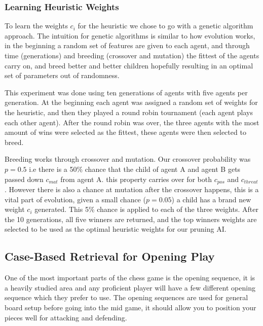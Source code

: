 \documentclass[letterpaper]{article}
\begin{document}
\subsubsection{Learning Heuristic Weights}
To learn the weights $c_i$ for the heuristic we chose to go with a genetic algorithm approach. The intuition for genetic algorithms is similar to how evolution works, in the beginning a random set of features are given to each agent, and through time (generations) and breeding (crossover and mutation) the fittest of the agents carry on, and breed better and better children hopefully resulting in an optimal set of parameters out of randomness.

This experiment was done using ten generations of agents with five agents per generation. At the beginning each agent was assigned a random set of weights for the heuristic, and then they played a round robin tournament (each agent plays each other agent). After the round robin was over, the three agents with the most amount of wins were selected as the fittest, these agents were then selected to breed.

Breeding works through crossover and mutation. Our crossover probability was $p=0.5$ i.e there is a 50\% chance that the child of agent A and agent B gets passed down $c_{mat}$ from agent A. this property carries over for both $c_{pos}$ and $c_{threat}$. However there is also a chance at mutation after the crossover happens, this is a vital part of evolution, given a small chance ($p=0.05$) a child has a brand new weight $c_i$ generated. This 5\% chance is applied to each of the three weights. After the 10 generations, all five winners are returned, and the top winners weights are selected to be used as the optimal heuristic weights for our pruning AI. 

\subsection{Case-Based Retrieval for Opening Play}
One of the most important parts of the chess game is the opening sequence, it is a heavily studied area and any proficient player will have a few different opening sequence which they prefer to use. The opening sequences are used for general board setup before going into the mid game, it should allow you to position your pieces well for attacking and defending.
\end{document}
